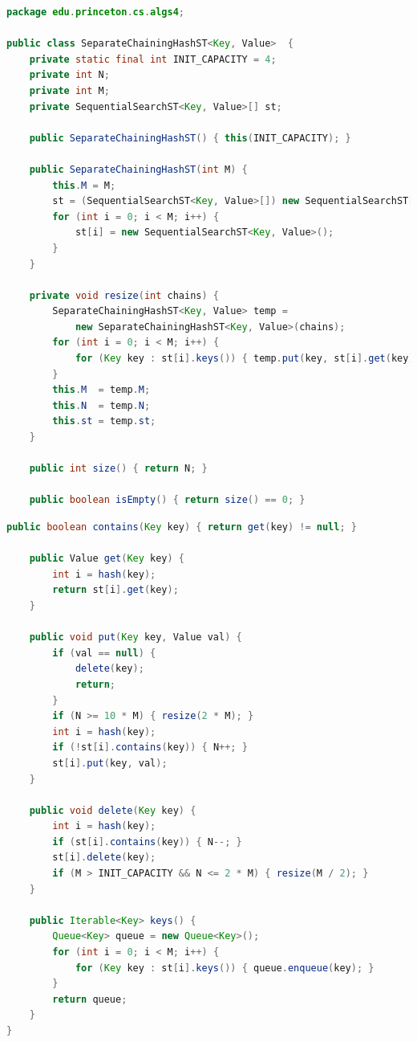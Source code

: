 \documentclass[8pt,a4paper,compress]{beamer}
\begin{document}
\begin{frame}[fragile]
\pause

\begin{lstlisting}[language=Java]
package edu.princeton.cs.algs4;

public class SeparateChainingHashST<Key, Value>  {
    private static final int INIT_CAPACITY = 4;
    private int N;
    private int M; 
    private SequentialSearchST<Key, Value>[] st; 

    public SeparateChainingHashST() { this(INIT_CAPACITY); } 

    public SeparateChainingHashST(int M) {
        this.M = M;
        st = (SequentialSearchST<Key, Value>[]) new SequentialSearchST[M];
        for (int i = 0; i < M; i++) { 
            st[i] = new SequentialSearchST<Key, Value>(); 
        }
    } 

    private void resize(int chains) {
        SeparateChainingHashST<Key, Value> temp = 
            new SeparateChainingHashST<Key, Value>(chains);
        for (int i = 0; i < M; i++) {
            for (Key key : st[i].keys()) { temp.put(key, st[i].get(key)); }
        }
        this.M  = temp.M;
        this.N  = temp.N;
        this.st = temp.st;
    }
    
    public int size() { return N; } 

    public boolean isEmpty() { return size() == 0; }
\end{lstlisting}
\end{frame}

\begin{frame}[fragile]
\pause

\begin{lstlisting}[language=Java]
    public boolean contains(Key key) { return get(key) != null; } 

    public Value get(Key key) {
        int i = hash(key);
        return st[i].get(key);
    } 

    public void put(Key key, Value val) {
        if (val == null) {
            delete(key);
            return;
        }
        if (N >= 10 * M) { resize(2 * M); }
        int i = hash(key);
        if (!st[i].contains(key)) { N++; }
        st[i].put(key, val);
    } 

    public void delete(Key key) {
        int i = hash(key);
        if (st[i].contains(key)) { N--; }
        st[i].delete(key);
        if (M > INIT_CAPACITY && N <= 2 * M) { resize(M / 2); }
    } 

    public Iterable<Key> keys() {
        Queue<Key> queue = new Queue<Key>();
        for (int i = 0; i < M; i++) {
            for (Key key : st[i].keys()) { queue.enqueue(key); }
        }
        return queue;
    } 
}
\end{lstlisting}
\end{frame}
\end{document}
